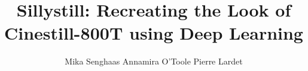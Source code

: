 \documentclass[runningheads]{llncs}
\begin{document}


\title{
    Sillystill: Recreating the Look of Cinestill-800T using Deep Learning
}

\author{Mika Senghaas \quad Annamira O'Toole \quad Pierre Lardet}


\maketitle
\thispagestyle{empty}







 





\newpage




\end{document}
